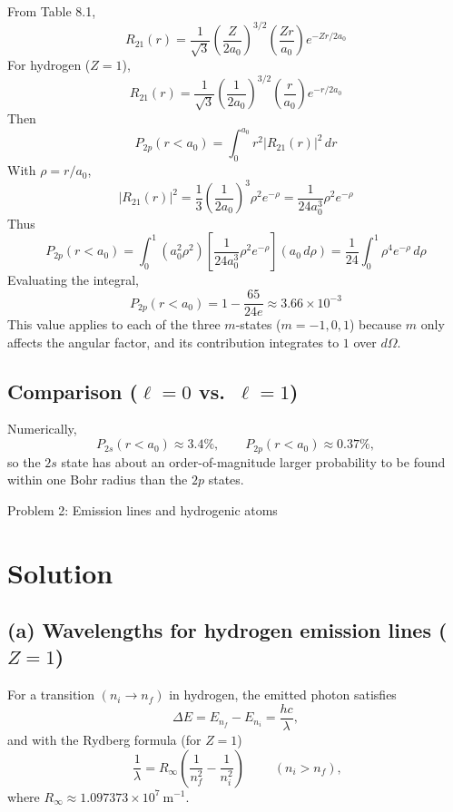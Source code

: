 \documentclass{article}
\begin{document}
From Table 8.1,
\[
R_{21}(r)=\frac{1}{\sqrt{3}}\left(\frac{Z}{2a_0}\right)^{3/2}\left(\frac{Zr}{a_0}\right)e^{-Zr/2a_0}
\]
For hydrogen ($Z=1$),
\[
R_{21}(r)=\frac{1}{\sqrt{3}}\left(\frac{1}{2a_0}\right)^{3/2}\left(\frac{r}{a_0}\right)e^{-r/2a_0}
\]
Then
\[
P_{2p}(r<a_0)=\int_0^{a_0} r^2 |R_{21}(r)|^2\,dr
\]
With $\rho=r/a_0$,
\[
|R_{21}(r)|^2
=\frac{1}{3}\left(\frac{1}{2a_0}\right)^3\rho^2 e^{-\rho}
=\frac{1}{24a_0^3}\rho^2 e^{-\rho}
\]
Thus
\[
P_{2p}(r<a_0)=\int_0^1 (a_0^2\rho^2)\left[\frac{1}{24a_0^3}\rho^2e^{-\rho}\right](a_0\,d\rho)
=\frac{1}{24}\int_0^1 \rho^4 e^{-\rho}\,d\rho
\]
Evaluating the integral,
\[
\boxed{
P_{2p}(r<a_0)=1-\frac{65}{24e}\approx 3.66\times 10^{-3}
}
\]
This value applies to each of the three $m$-states ($m=-1,0,1$) because $m$ only affects the angular factor, and its contribution integrates to $1$ over $d\Omega$.


\subsection*{Comparison ($\ell=0$ vs.\ $\ell=1$)}

Numerically,
\[
P_{2s}(r<a_0)\approx 3.4\%,
\qquad
P_{2p}(r<a_0)\approx 0.37\%,
\]
so the $2s$ state has about an order-of-magnitude larger probability to be found within one Bohr radius than the $2p$ states.

\newpage

{\huge Problem 2: Emission lines and hydrogenic atoms}

\section*{Solution}

\subsection*{(a) Wavelengths for hydrogen emission lines ($Z=1$)}

For a transition $(n_i\to n_f)$ in hydrogen, the emitted photon satisfies
\[
\Delta E = E_{n_f}-E_{n_i} = \frac{hc}{\lambda},
\]
and with the Rydberg formula (for $Z=1$)
\[
\boxed{\;\frac{1}{\lambda}=R_\infty\!\left(\frac{1}{n_f^2}-\frac{1}{n_i^2}\right)\;}
\qquad (n_i>n_f),
\]
where $R_\infty \approx 1.097373\times 10^7~\mathrm{m^{-1}}$.
\end{document}
